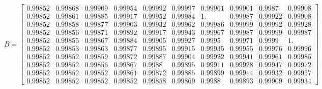\begin{equation}\label{eq:results_payoff_matrices_1}
    B =
    \begin{bmatrix}
        0.99852 & 0.99868 & 0.99909 & 0.99954 & 0.99992 & 0.99997 & 0.99961 &
        0.99901 & 0.9987  & 0.99908 \\
        0.99852 & 0.99861 & 0.99885 & 0.99917 & 0.99952 & 0.99984 & 1.      &
        0.99987 & 0.99922 & 0.99908 \\
        0.99852 & 0.99858 & 0.99877 & 0.99903 & 0.99932 & 0.99962 & 0.99986 &
        0.99999 & 0.99992 & 0.99928 \\
        0.99852 & 0.99856 & 0.99871 & 0.99892 & 0.99917 & 0.99943 & 0.99967 &
        0.99987 & 0.99999 & 0.99987 \\
        0.99852 & 0.99855 & 0.99867 & 0.99884 & 0.99905 & 0.99927 & 0.9995  &
        0.99971 & 0.9999  & 1.      \\
        0.99852 & 0.99853 & 0.99863 & 0.99877 & 0.99895 & 0.99915 & 0.99935 &
        0.99955 & 0.99976 & 0.99996 \\
        0.99852 & 0.99852 & 0.99859 & 0.99872 & 0.99887 & 0.99904 & 0.99922 &
        0.99941 & 0.99961 & 0.99985 \\
        0.99852 & 0.99852 & 0.99856 & 0.99867 & 0.9988  & 0.99895 & 0.99911 &
        0.99928 & 0.99947 & 0.99972 \\
        0.99852 & 0.99852 & 0.99852 & 0.99861 & 0.99872 & 0.99885 & 0.99899 &
        0.99914 & 0.99932 & 0.99957 \\
        0.99852 & 0.99852 & 0.99852 & 0.99852 & 0.99858 & 0.99869 & 0.9988  &
        0.99893 & 0.99909 & 0.99934
    \end{bmatrix}
\end{equation}

